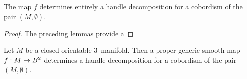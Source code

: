 \begin{theorem}
	\label{lem:3body4handle}
	\label{thm:3bound4}
	The map $f$ determines entirely a handle decomposition for a cobordism of the pair $(M,\emptyset)$.
\end{theorem}

\begin{proof}
	The preceding lemmas provide a
	
\end{proof}

\begin{theorem}

	Let $M$ be a closed orientable 3--manifold.
	Then a proper generic smooth map $f:M\to B^2$ determines a handle decomposition for a cobordism of the pair $(M,\emptyset)$.
\end{theorem}

